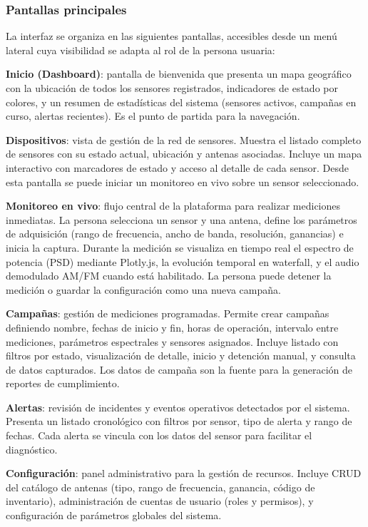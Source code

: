 \subsubsection*{Pantallas principales}

La interfaz se organiza en las siguientes pantallas, accesibles desde un menú
lateral cuya visibilidad se adapta al rol de la persona usuaria:

\textbf{Inicio (Dashboard)}: pantalla de bienvenida que presenta un mapa
geográfico con la ubicación de todos los sensores registrados, indicadores de
estado por colores, y un resumen de estadísticas del sistema (sensores
activos, campañas en curso, alertas recientes). Es el punto de partida para la
navegación.

\textbf{Dispositivos}: vista de gestión de la red de sensores. Muestra el
listado completo de sensores con su estado actual, ubicación y antenas
asociadas. Incluye un mapa interactivo con marcadores de estado y acceso al
detalle de cada sensor. Desde esta pantalla se puede iniciar un monitoreo en
vivo sobre un sensor seleccionado.

\textbf{Monitoreo en vivo}: flujo central de la plataforma para realizar
mediciones inmediatas. La persona selecciona un sensor y una antena, define
los parámetros de adquisición (rango de frecuencia, ancho de banda,
resolución, ganancias) e inicia la captura. Durante la medición se visualiza
en tiempo real el espectro de potencia (PSD) mediante Plotly.js, la evolución
temporal en waterfall, y el audio demodulado AM/FM cuando está habilitado. La
persona puede detener la medición o guardar la configuración como una nueva
campaña.

\textbf{Campañas}: gestión de mediciones programadas. Permite crear campañas
definiendo nombre, fechas de inicio y fin, horas de operación, intervalo entre
mediciones, parámetros espectrales y sensores asignados. Incluye listado con
filtros por estado, visualización de detalle, inicio y detención manual, y
consulta de datos capturados. Los datos de campaña son la fuente para la
generación de reportes de cumplimiento.

\textbf{Alertas}: revisión de incidentes y eventos operativos detectados por
el sistema. Presenta un listado cronológico con filtros por sensor, tipo de
alerta y rango de fechas. Cada alerta se vincula con los datos del sensor
para facilitar el diagnóstico.

\textbf{Configuración}: panel administrativo para la gestión de recursos.
Incluye CRUD del catálogo de antenas (tipo, rango de frecuencia, ganancia,
código de inventario), administración de cuentas de usuario (roles y
permisos), y configuración de parámetros globales del sistema.

